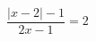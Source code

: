 \begin{ex}[type=equation]
	\begin{condition}
		$\dfrac{\big|x - 2\big| - 1}{2x - 1} = 2$
	\end{condition}
\end{ex}